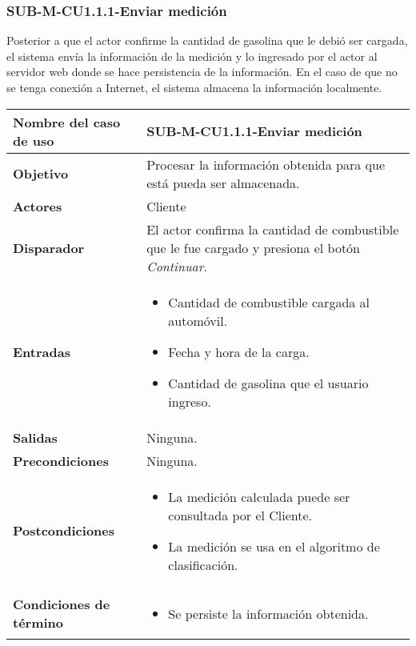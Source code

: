 \subsubsection{SUB-M-CU1.1.1-Enviar medición}\label{SUB-M-CU1.1.1}
Posterior a que el actor confirme la cantidad de gasolina que le debió ser cargada, el sistema envía la información de la medición y lo ingresado por el actor al servidor web donde se hace persistencia de la información. En el caso de que no se tenga conexión a Internet, el sistema almacena la información localmente.

\begin{longtable}{|J{5cm}|J{10.3cm}|}
	\hline
	\textbf{Nombre del caso de uso} &
		SUB-M-CU1.1.1-Enviar medición \\ \hline
	\textbf{Objetivo} &
		Procesar la información obtenida para que está pueda ser almacenada. \\ \hline
	\textbf{Actores} &
		Cliente \\ \hline 
	\textbf{Disparador} & 
		El actor confirma la cantidad de combustible que le fue cargado y presiona el botón \textit{Continuar}. \\ \hline 
	\textbf{Entradas} & 
		\begin{itemize}
				\item Cantidad de combustible cargada al automóvil.
				\item Fecha y hora de la carga.
				\item Cantidad de gasolina que el usuario ingreso.
		\end{itemize}\\ \hline 
	\textbf{Salidas} & Ninguna.
		\\ \hline
	\textbf{Precondiciones} & 
		Ninguna.\\ \hline
	\textbf{Postcondiciones} &
		\begin{itemize}
			\item La medición calculada puede ser consultada por el Cliente.
			\item La medición se usa en el algoritmo de clasificación.
		\end{itemize} \\ \hline
	\textbf{Condiciones de término} & 
		\begin{itemize}
			\item Se persiste la información obtenida.

\end{itemize}
\end{longtable}

